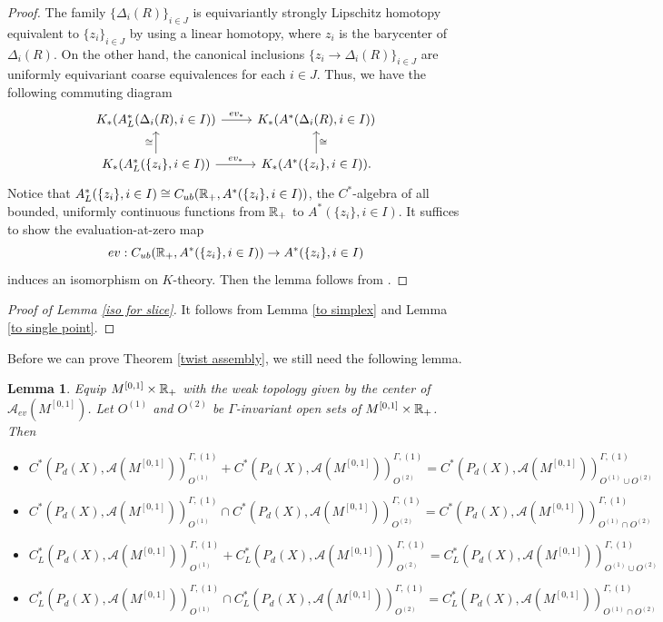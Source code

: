 \documentclass[11pt]{article}
\theoremstyle{definition}
\theoremstyle{plain}
\newtheorem{Lem}[Def]{Lemma}
\def\A{\mathcal A}\def\C{\mathcal C}\def\B{\mathcal B}\def\E{\mathcal E}\def\O{\mathcal O}\def\h{\mathfrak h}\def\K{\mathcal K}\def\F{\mathcal F}\def\P{\mathcal P}\def\L{\mathcal L}\def\R{\mathcal R}\def\Q{\mathcal Q}\def\H{\mathcal H}\def\S{\mathcal S}\def\N{\mathcal N}\def\U{\mathcal U}\def\V{\mathcal V}
\def\Ga{\Gamma}
\begin{document}
\begin{proof}
The family $\{\Delta_i(R)\}_{i\in J}$ is equivariantly strongly Lipschitz homotopy equivalent to $\{z_i\}_{i\in J}$ by using a linear homotopy, where $z_i$ is the barycenter of $\Delta_i(R)$. On the other hand, the canonical inclusions $\{z_i\to \Delta_i(R)\}_{i\in J}$ are uniformly equivariant coarse equivalences for each $i\in J$. Thus, we have the following commuting diagram
$$\begin{tikzcd}
{K_*(A^*_L(\Delta_i(R),i\in I))}  \arrow[r, "ev_*"] & {K_*(A^*(\Delta_i(R),i\in I))} \\
{K_*(A^*_L(\{z_i\},i\in I))} \arrow[u, "\cong"]\arrow[r, "ev_*"]    & {K_*(A^*(\{z_i\},i\in I))\arrow[u, "\cong"'] .}                       
\end{tikzcd}$$
Notice that $A^*_L(\{z_i\},i\in I)\cong C_{ub}(\mathbb R_+,A^*(\{z_i\},i\in I))$, the $C^*$-algebra of all bounded, uniformly continuous functions from $\mathbb R_+$ to $A^*(\{z_i\},i\in I)$. It suffices to show the evaluation-at-zero map
$$ev:C_{ub}(\mathbb R_+,A^*(\{z_i\},i\in I))\to A^*(\{z_i\},i\in I)$$
induces an isomorphism on $K$-theory. Then the lemma follows from \cite[Lemma 12.4.3]{HIT2020}.
\end{proof}

\begin{proof}[Proof of Lemma \ref{iso for slice}]
It follows from Lemma \ref{to simplex} and Lemma \ref{to single point}.
\end{proof}

Before we can prove Theorem \ref{twist assembly}, we still need the following lemma.

\begin{Lem}\label{cutting and pasting}
Equip $M^{[0,1]}\times\mathbb R_+$ with the weak topology given by the center of $\A_{ev}(M^{[0,1]})$. Let $O^{(1)}$ and $O^{(2)}$ be $\Ga$-invariant open sets of $M^{[0,1]}\times\mathbb R_+$. Then
\begin{itemize}
\item[(1)]$C^*(P_d(X),\A(M^{[0,1]}))^{\Ga,(1)}_{O^{(1)}}+C^*(P_d(X),\A(M^{[0,1]}))^{\Ga,(1)}_{O^{(2)}}=C^*(P_d(X),\A(M^{[0,1]}))^{\Ga,(1)}_{O^{(1)}\cup O^{(2)}}$
\item[(2)]$C^*(P_d(X),\A(M^{[0,1]}))^{\Ga,(1)}_{O^{(1)}}\cap C^*(P_d(X),\A(M^{[0,1]}))^{\Ga,(1)}_{O^{(2)}}=C^*(P_d(X),\A(M^{[0,1]}))^{\Ga,(1)}_{O^{(1)}\cap O^{(2)}}$
\item[(3)]$C^*_L(P_d(X),\A(M^{[0,1]}))^{\Ga,(1)}_{O^{(1)}}+C^*_L(P_d(X),\A(M^{[0,1]}))^{\Ga,(1)}_{O^{(2)}}=C^*_L(P_d(X),\A(M^{[0,1]}))^{\Ga,(1)}_{O^{(1)}\cup O^{(2)}}$
\item[(4)]$C^*_L(P_d(X),\A(M^{[0,1]}))^{\Ga,(1)}_{O^{(1)}}\cap C^*_L(P_d(X),\A(M^{[0,1]}))^{\Ga,(1)}_{O^{(2)}}=C^*_L(P_d(X),\A(M^{[0,1]}))^{\Ga,(1)}_{O^{(1)}\cap O^{(2)}}$
\end{itemize}\end{Lem}
\end{document}
